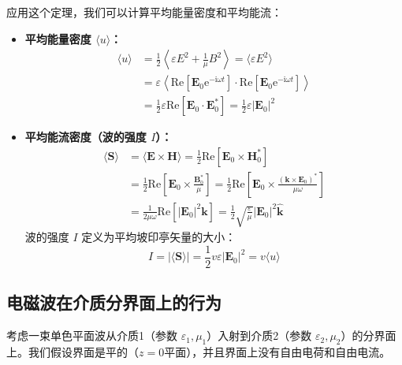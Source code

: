 \documentclass[fontset=none]{ctexart}
\begin{document}
应用这个定理，我们可以计算平均能量密度和平均能流：
\begin{itemize}
    \item \textbf{平均能量密度 $\langle u \rangle$：}
    \begin{equation}
    \begin{aligned}
        \langle u \rangle &= \frac{1}{2} \left\langle \varepsilon E^2 + \frac{1}{\mu} B^2 \right\rangle = \langle \varepsilon E^2 \rangle \\
        &= \varepsilon \left\langle \mathrm{Re}[\bm{E}_0 \mathrm{e}^{-\mathrm{i}\omega t}] \cdot \mathrm{Re}[\bm{E}_0 \mathrm{e}^{-\mathrm{i}\omega t}] \right\rangle \\
        &= \frac{1}{2} \varepsilon \mathrm{Re}[\bm{E}_0 \cdot \bm{E}_0^*] = \frac{1}{2} \varepsilon |\bm{E}_0|^2
    \end{aligned}
    \end{equation}

    \item \textbf{平均能流密度（波的强度 $I$）：}
    \begin{equation}
    \begin{aligned}
        \langle \bm{S} \rangle &= \langle \bm{E} \times \bm{H} \rangle = \frac{1}{2} \mathrm{Re}[\bm{E}_0 \times \bm{H}_0^*] \\
        &= \frac{1}{2} \mathrm{Re}\left[\bm{E}_0 \times \frac{\bm{B}_0^*}{\mu}\right] = \frac{1}{2} \mathrm{Re}\left[\bm{E}_0 \times \frac{(\bm{k} \times \bm{E}_0)^*}{\mu\omega}\right] \\
        &= \frac{1}{2\mu\omega} \mathrm{Re}[|\bm{E}_0|^2 \bm{k}] = \frac{1}{2} \sqrt{\frac{\varepsilon}{\mu}} |\bm{E}_0|^2 \hat{\bm{k}}
    \end{aligned}
    \end{equation}
    波的强度 $I$ 定义为平均坡印亭矢量的大小：
    \begin{equation}
        I = |\langle \bm{S} \rangle| = \frac{1}{2} v \varepsilon |\bm{E}_0|^2 = v \langle u \rangle
    \end{equation}
\end{itemize}

\subsection{电磁波在介质分界面上的行为}
考虑一束单色平面波从介质1（参数 $\varepsilon_1, \mu_1$）入射到介质2（参数 $\varepsilon_2, \mu_2$）的分界面上。我们假设界面是平的（$z=0$平面），并且界面上没有自由电荷和自由电流。
\end{document}
